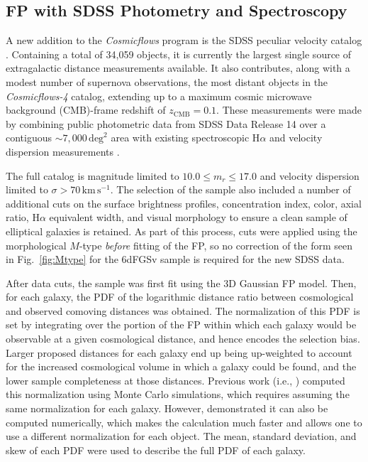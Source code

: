 \documentclass[twocolumn]{aastex63}
\begin{document}

\subsection{FP with SDSS Photometry and Spectroscopy}
\label{sec:sdss}

A new addition to the \textit{Cosmicflows} program is the SDSS peculiar velocity catalog \citep{2022MNRAS.515..953H}. Containing a total of 34,059 objects, it is currently the largest single source of extragalactic distance measurements available. It also contributes, along with a modest number of supernova observations, the most distant objects in the \textit{Cosmicflows-4} catalog, extending up to a maximum cosmic microwave background (CMB)-frame redshift of $z_{\mathrm{CMB}}=0.1$. These measurements were made by combining public photometric data from SDSS Data Release 14 \citep{2018ApJS..235...42A} over a contiguous $\sim7,000\,\mathrm{deg}^{2}$ area with existing spectroscopic H$\alpha$ and velocity dispersion measurements \citep{2013MNRAS.431.1383T}.

The full catalog is magnitude limited to $10.0 \le m_{r} \le 17.0$ and velocity dispersion limited to $\sigma > 70\,\mathrm{km\,s^{-1}}$. The selection of the sample also included a number of additional cuts on the surface brightness profiles, concentration index, color, axial ratio, H$\alpha$ equivalent width, and visual morphology to ensure a clean sample of elliptical galaxies is retained. As part of this process, cuts were applied using the morphological $M$-type \citep{2011A&A...529A..53T} \textit{before} fitting of the FP, so no correction of the form seen in Fig.~\ref{fig:Mtype} for the 6dFGSv sample is required for the new SDSS data.

After data cuts, the sample was first fit using the 3D Gaussian FP model. Then, for each galaxy, the PDF of the logarithmic distance ratio between cosmological and observed comoving distances was obtained. 
The normalization of this PDF is set by integrating over the portion of the FP within which each galaxy would be observable at a given cosmological distance, and hence encodes the selection bias. Larger proposed distances for each galaxy end up being up-weighted to account for the increased cosmological volume in which a galaxy could be found, and the lower sample completeness at those distances. Previous work (i.e., \citep{2014MNRAS.445.2677S}) computed this normalization using Monte Carlo simulations, which requires assuming the same normalization for each galaxy. However, \citet{2022MNRAS.515..953H} demonstrated it can also be computed numerically, which makes the calculation much faster and allows one to use a different normalization for each object.
The mean, standard deviation, and skew of each PDF were used to describe the full PDF of each galaxy.
\end{document}
